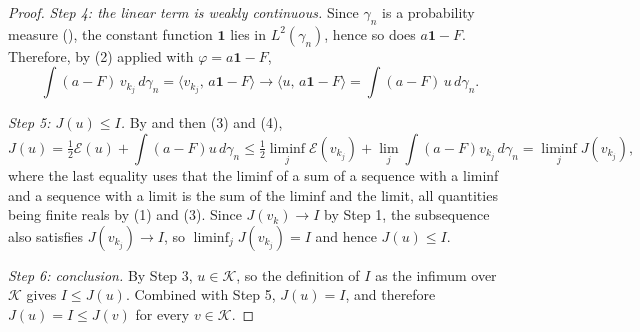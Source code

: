 \begin{proof}
\emph{Step 4: the linear term is weakly continuous.}
Since $\gamma_n$ is a probability measure (), the constant
function $\mathbf{1}$ lies in $L^2(\gamma_n)$, hence so does
$a\mathbf{1} - F$.  Therefore, by (2) applied with
$\varphi = a\mathbf{1} - F$,
\begin{equation*}
  \int (a - F)\, v_{k_j}\, d\gamma_n
    = \langle v_{k_j},\, a\mathbf{1} - F\rangle
    \longrightarrow \langle u,\, a\mathbf{1} - F\rangle
    = \int (a-F)\, u \, d\gamma_n . \tag{4}
\end{equation*}

\emph{Step 5: $J(u) \leq I$.}
By  and then (3) and (4),
\[
  J(u) = \tfrac12 \mathcal{E}(u) + \int (a-F)u\, d\gamma_n
   \leq \tfrac12 \liminf_j \mathcal{E}(v_{k_j})
         + \lim_j \int (a-F)v_{k_j}\, d\gamma_n
   = \liminf_j J(v_{k_j}) ,
\]
where the last equality uses that the liminf of a sum of a sequence with a
liminf and a sequence with a limit is the sum of the liminf and the limit, all
quantities being finite reals by (1) and (3).  Since $J(v_k) \to I$ by Step 1, the
subsequence also satisfies $J(v_{k_j}) \to I$, so $\liminf_j J(v_{k_j}) = I$ and
hence $J(u) \leq I$.

\emph{Step 6: conclusion.}
By Step 3, $u \in \mathcal{K}$, so the definition of $I$ as the infimum over
$\mathcal{K}$ gives $I \leq J(u)$.  Combined with Step 5, $J(u) = I$, and
therefore $J(u) = I \leq J(v)$ for every $v \in \mathcal{K}$.
\end{proof}
